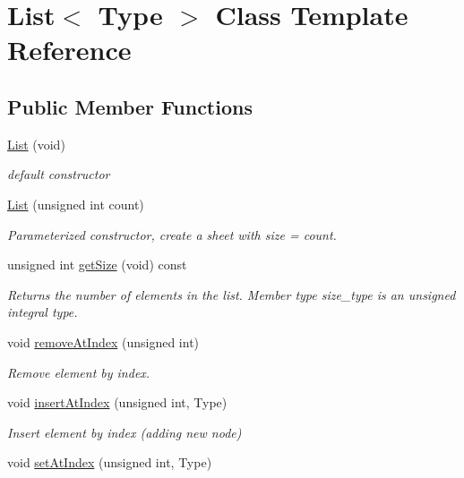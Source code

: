 \hypertarget{classList}{}\section{List$<$ Type $>$ Class Template Reference}
\label{classList}
\subsection*{Public Member Functions}
\begin{DoxyCompactItemize}
\item 
\mbox{\label{classList_aa54d1f54bc0fbf91f434d55e66dc588b}} 
\hyperlink{classList_aa54d1f54bc0fbf91f434d55e66dc588b}{List} (void)
\begin{DoxyCompactList}\small\item\em default constructor \end{DoxyCompactList}\item 
\hyperlink{classList_add72f882a3484ed68b14b8c8c797a1f6}{List} (unsigned int count)
\begin{DoxyCompactList}\small\item\em Parameterized constructor, create a sheet with size = count. \end{DoxyCompactList}\item 
unsigned int \hyperlink{classList_a261ca8c729d011b0ff08a4da4d5b9d2f}{get\+Size} (void) const
\begin{DoxyCompactList}\small\item\em Returns the number of elements in the list. Member type size\+\_\+type is an unsigned integral type. \end{DoxyCompactList}\item 
void \hyperlink{classList_a07496984175b07818abe40573209c7d1}{remove\+At\+Index} (unsigned int)
\begin{DoxyCompactList}\small\item\em Remove element by index. \end{DoxyCompactList}\item 
void \hyperlink{classList_afef72ae14d1dc037bfda14ec555f4856}{insert\+At\+Index} (unsigned int, Type)
\begin{DoxyCompactList}\small\item\em Insert element by index (adding new node) \end{DoxyCompactList}\item 
void \hyperlink{classList_a8a1748e3792f7c0ee8ff1a89f823b159}{set\+At\+Index} (unsigned int, Type)

\end{DoxyCompactItemize}
